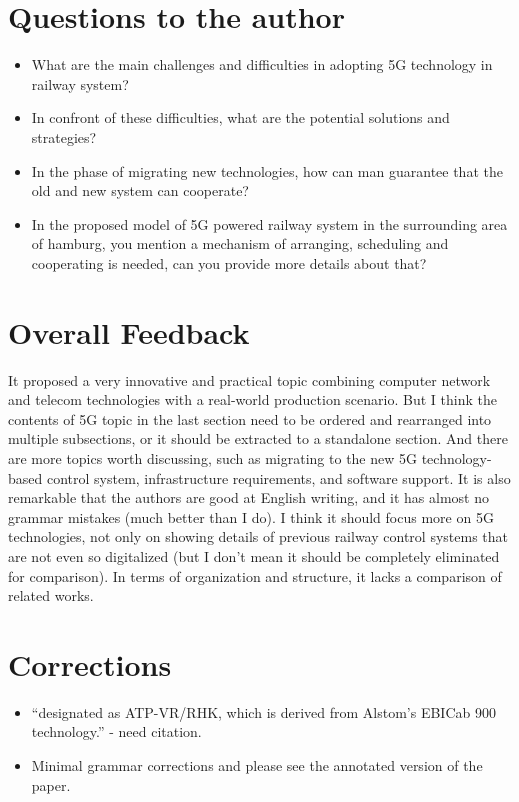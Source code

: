 \documentclass[a4paper,9pt]{scrartcl}
\begin{document}
\section{Questions to the author}
\begin{itemize}
\item What are the main challenges and difficulties in adopting 5G technology in railway system?


\item In confront of these difficulties, what are the potential solutions and strategies?

\item In the phase of migrating new technologies, how can man guarantee that the old and new system can cooperate?

\item In the proposed model of 5G powered railway system in the surrounding area of hamburg, you mention a mechanism of arranging, scheduling and cooperating is needed, can you provide more details about that?

\end{itemize}

\section{Overall Feedback}
It proposed a very innovative and practical topic combining computer network and telecom technologies with a real-world production scenario.
But I think the contents of 5G topic in the last section need to be ordered and rearranged into multiple subsections, or it should be extracted to a standalone section.
And there are more topics worth discussing, such as migrating to the new 5G technology-based control system, infrastructure requirements, and software support.
It is also remarkable that the authors are good at English writing, and it has almost no grammar mistakes (much better than I do).
I think it should focus more on 5G technologies, not only on showing details of previous railway control systems that are not even so digitalized (but I don't mean it should be completely eliminated for comparison).
In terms of organization and structure, it lacks a comparison of related works.

\section{Corrections}
\begin{itemize}
    \item \enquote{designated as ATP-VR/RHK, which is derived from Alstom’s
EBICab 900 technology.} - need citation.
    \item Minimal grammar corrections and please see the annotated version of the paper.
\end{itemize}
\end{document}
